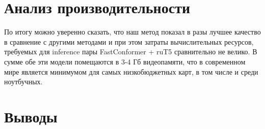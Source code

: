 \section{Анализ производительности}
По итогу можно уверенно сказать, что наш метод показал в разы лучшее качество в сравнение с другими методами и при этом затраты вычислительных ресурсов, требуемых для inference пары FastConformer + ruT5 сравнительно не велико.
В сумме обе эти модели помещаются в 3-4 Гб видеопамяти, что в современном мире является минимумом для самых низкобюджетных карт, в том числе и среди ноутбучных.

\section{Выводы}
